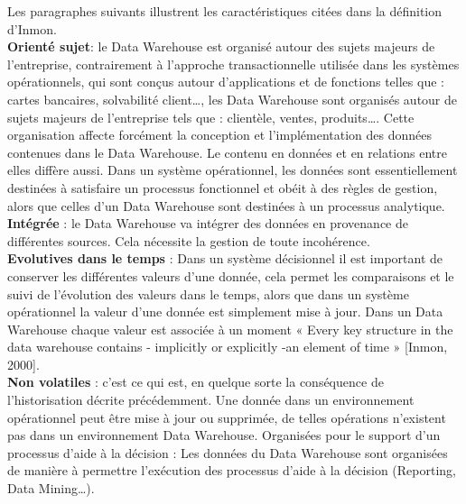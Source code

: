 Les paragraphes suivants illustrent les caractéristiques citées dans la définition d’Inmon.\\
\textbf{Orienté sujet}: le Data Warehouse est organisé autour des sujets majeurs de l’entreprise, contrairement à l’approche transactionnelle utilisée dans les systèmes opérationnels, qui sont conçus autour d’applications et de fonctions telles que : cartes bancaires, solvabilité client…, les Data Warehouse sont organisés autour de sujets majeurs de l’entreprise tels que : clientèle, ventes, produits…. Cette organisation affecte forcément la conception et l’implémentation des données contenues dans le Data Warehouse. Le contenu en données et en relations entre elles diffère aussi. Dans un système opérationnel, les données sont essentiellement destinées à satisfaire un processus fonctionnel et obéit à des règles de gestion, alors que celles d’un Data Warehouse sont destinées à un processus analytique.\\
\textbf{Intégrée }: le Data Warehouse va intégrer des données en provenance de différentes sources. Cela nécessite la gestion de toute incohérence.\\
\textbf{Evolutives dans le temps} : Dans un système décisionnel il est important de conserver les différentes valeurs d’une donnée, cela permet les comparaisons et le suivi de l’évolution des valeurs dans le temps, alors que dans un système opérationnel la valeur d’une donnée est simplement mise à jour. Dans un Data Warehouse chaque valeur est associée à un moment
« Every key structure in the data warehouse contains - implicitly or explicitly -an element of time » [Inmon, 2000].\\
\textbf{Non volatiles} : c’est ce qui est, en quelque sorte la conséquence de l’historisation décrite précédemment. Une donnée dans un environnement opérationnel peut être mise à jour ou supprimée, de telles opérations n’existent pas dans un environnement Data Warehouse. Organisées pour le support d’un processus d’aide à la décision : Les données du Data Warehouse sont organisées de manière à permettre l’exécution des processus d’aide à la décision (Reporting, Data Mining…).


